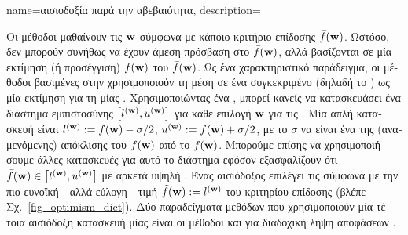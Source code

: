 {name={\foreignlanguage{greek}{αισιοδοξία παρά την αβεβαιότητα}},
	description={\foreignlanguage{greek}{Οι μέθοδοι}  
		\foreignlanguage{greek}{μαθαίνουν τις}  ${\bf w}$ \foreignlanguage{greek}{σύμφωνα με κάποιο κριτήριο 
		επίδοσης $\bar{f}({\bf w})$. Ωστόσο, δεν μπορούν συνήθως να έχουν άμεση πρόσβαση στο $\bar{f}({\bf w})$, αλλά βασίζονται σε μία 
		εκτίμηση (ή προσέγγιση) $f({\bf w})$ του $\bar{f}({\bf w})$. Ως ένα χαρακτηριστικό παράδειγμα, οι μέθοδοι βασιμένες στην} 
		 \foreignlanguage{greek}{χρησιμοποιούν τη μέση}  \foreignlanguage{greek}{σε ένα συγκεκριμένο} 
		 \foreignlanguage{greek}{(δηλαδή το} ) \foreignlanguage{greek}{ως μία εκτίμηση για τη}  
		 \foreignlanguage{greek}{μίας} . \foreignlanguage{greek}{Χρησιμοποιώντας ένα} 
		, \foreignlanguage{greek}{μπορεί κανείς να κατασκευάσει ένα διάστημα εμπιστοσύνης  
		$\big[ l^{({\bf w})},  u^{({\bf w})} \big]$ για κάθε επιλογή ${\bf w}$ για τις} . \foreignlanguage{greek}{Μία 
		απλή κατασκευή είναι $l^{({\bf w})} := f({\bf w}) - \sigma/2$, $u^{({\bf w})} := f({\bf w})+ \sigma/2$, 
	    	με το $\sigma$ να είναι ένα}  \foreignlanguage{greek}{της (αναμενόμενης) απόκλισης του $f({\bf w})$ από το 
		$\bar{f}({\bf w})$. Μπορούμε επίσης να χρησιμοποιήσουμε άλλες κατασκευές για αυτό το διάστημα εφόσον εξασφαλίζουν ότι 
		$\bar{f}({\bf w}) \in\big[ l^{({\bf w})},  u^{({\bf w})} \big]$ με αρκετά υψηλή} . \foreignlanguage{greek}{Ένας 
		αισιόδοξος επιλέγει τις}  \foreignlanguage{greek}{σύμφωνα με την πιο ευνοϊκή—αλλά εύλογη—τιμή 
		$\tilde{f}({\bf w}) :=  l^{({\bf w})}$ του κριτηρίου επίδοσης (βλέπε Σχ.\ \ref{fig_optimism_dict}). Δύο παραδείγματα μεθόδων} 
		 \foreignlanguage{greek}{που χρησιμοποιούν μία τέτοια αισιόδοξη κατασκευή μίας}  
		\foreignlanguage{greek}{είναι οι μέθοδοι}  \cite[\foreignlanguage{greek}{Κεφ.} 11]{ShalevMLBook} 
		\foreignlanguage{greek}{και}  \foreignlanguage{greek}{για διαδοχική λήψη αποφάσεων} \cite[\foreignlanguage{greek}{Ενότητα} 2.2]{Bubeck2012}. 
		\begin{figure}[H]
			\begin{center}

\end{center}
\end{figure}}}

